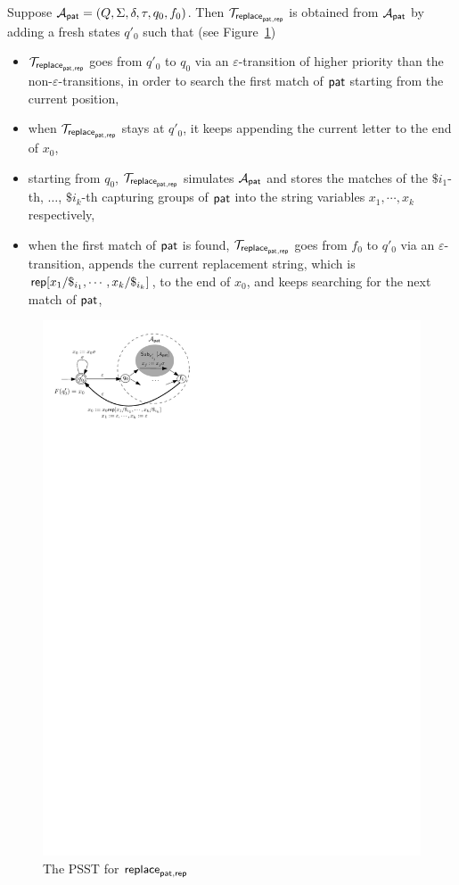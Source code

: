 Suppose $\mathcal{A}_{\mathsf{pat}} = (Q, \Sigma, \delta, \tau, q_0, f_0)$. Then $\mathcal{T}_{\mathsf{replace}_{\mathsf{pat},\mathsf{rep}}}$ is obtained from $\mathcal{A}_{\mathsf{pat}}$ by adding a fresh states $q'_0$ such that (see Figure~\ref{fig-psst-replace})
\begin{itemize}
\item $\mathcal{T}_{\mathsf{replace}_{\mathsf{pat},\mathsf{rep}}}$ goes from $q'_0$ to $q_0$ via an $\varepsilon$-transition of higher priority than the non-$\varepsilon$-transitions, in order to search the first match of $\mathsf{pat}$ starting from the current position, 
%
\item when $\mathcal{T}_{\mathsf{replace}_{\mathsf{pat},\mathsf{rep}}}$ stays at $q'_0$, it keeps appending the current letter to the end of $x_0$, 
%
\item starting from $q_0$, $\mathcal{T}_{\mathsf{replace}_{\mathsf{pat},\mathsf{rep}}}$ simulates $\mathcal{A}_{\mathsf{pat}}$ and stores the matches of the $\$i_1$-th, $\ldots$, $\$i_k$-th capturing groups of $\mathsf{pat}$ into the string variables $x_1, \cdots, x_k$ respectively,   
%
\item when the first match of $\mathsf{pat}$ is found, $\mathcal{T}_{\mathsf{replace}_{\mathsf{pat},\mathsf{rep}}}$ goes from $f_0$ to $q'_0$ via an $\varepsilon$-transition, appends the current replacement string, which is $\mathsf{rep}[x_1/\$_{i_1}, \cdots, x_k/\$_{i_k}]$, to the end of $x_0$, and keeps searching for the next match of $\mathsf{pat}$, 
\end{itemize}

\begin{figure}[ht]
\centering
\includegraphics[scale=0.65]{psst-replace.pdf}
\caption{The PSST for $\mathsf{replace}_{\mathsf{pat},\mathsf{rep}}$}
\label{fig-psst-replace}
\end{figure}

